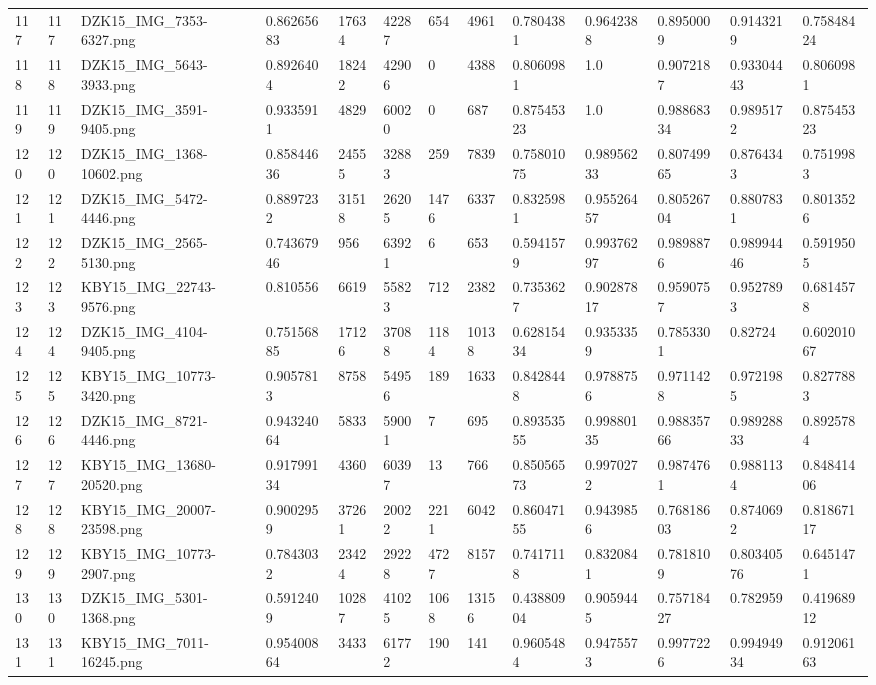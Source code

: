 \documentclass[11pt, a4paper, twoside]{report}
\begin{document}
\begin{longtable}[c]{@{}lllllllllllll@{}}
117 & 117 & DZK15\_IMG\_7353-6327.png & 0.86265683 & 17634 & 42287 & 654 & 4961 & 0.7804381 & 0.9642388 & 0.8950009 & 0.9143219 & 0.75848424 \\
118 & 118 & DZK15\_IMG\_5643-3933.png & 0.8926404 & 18242 & 42906 & 0 & 4388 & 0.8060981 & 1.0 & 0.9072187 & 0.93304443 & 0.8060981 \\
119 & 119 & DZK15\_IMG\_3591-9405.png & 0.9335911 & 4829 & 60020 & 0 & 687 & 0.87545323 & 1.0 & 0.98868334 & 0.9895172 & 0.87545323 \\
120 & 120 & DZK15\_IMG\_1368-10602.png & 0.85844636 & 24555 & 32883 & 259 & 7839 & 0.75801075 & 0.98956233 & 0.80749965 & 0.8764343 & 0.7519983 \\
121 & 121 & DZK15\_IMG\_5472-4446.png & 0.8897232 & 31518 & 26205 & 1476 & 6337 & 0.8325981 & 0.95526457 & 0.80526704 & 0.8807831 & 0.8013526 \\
122 & 122 & DZK15\_IMG\_2565-5130.png & 0.74367946 & 956 & 63921 & 6 & 653 & 0.5941579 & 0.99376297 & 0.9898876 & 0.98994446 & 0.5919505 \\
123 & 123 & KBY15\_IMG\_22743-9576.png & 0.810556 & 6619 & 55823 & 712 & 2382 & 0.7353627 & 0.90287817 & 0.9590757 & 0.9527893 & 0.6814578 \\
124 & 124 & DZK15\_IMG\_4104-9405.png & 0.75156885 & 17126 & 37088 & 1184 & 10138 & 0.62815434 & 0.9353359 & 0.7853301 & 0.82724 & 0.60201067 \\
125 & 125 & KBY15\_IMG\_10773-3420.png & 0.9057813 & 8758 & 54956 & 189 & 1633 & 0.8428448 & 0.9788756 & 0.9711428 & 0.9721985 & 0.8277883 \\
126 & 126 & DZK15\_IMG\_8721-4446.png & 0.94324064 & 5833 & 59001 & 7 & 695 & 0.89353555 & 0.99880135 & 0.98835766 & 0.98928833 & 0.8925784 \\
127 & 127 & KBY15\_IMG\_13680-20520.png & 0.91799134 & 4360 & 60397 & 13 & 766 & 0.85056573 & 0.9970272 & 0.9874761 & 0.9881134 & 0.84841406 \\
128 & 128 & KBY15\_IMG\_20007-23598.png & 0.9002959 & 37261 & 20022 & 2211 & 6042 & 0.86047155 & 0.9439856 & 0.76818603 & 0.8740692 & 0.81867117 \\
129 & 129 & KBY15\_IMG\_10773-2907.png & 0.7843032 & 23424 & 29228 & 4727 & 8157 & 0.7417118 & 0.8320841 & 0.7818109 & 0.80340576 & 0.6451471 \\
130 & 130 & DZK15\_IMG\_5301-1368.png & 0.5912409 & 10287 & 41025 & 1068 & 13156 & 0.43880904 & 0.9059445 & 0.75718427 & 0.782959 & 0.41968912 \\
131 & 131 & KBY15\_IMG\_7011-16245.png & 0.95400864 & 3433 & 61772 & 190 & 141 & 0.9605484 & 0.9475573 & 0.9977226 & 0.99494934 & 0.91206163 \\

\end{longtable}
\end{document}
